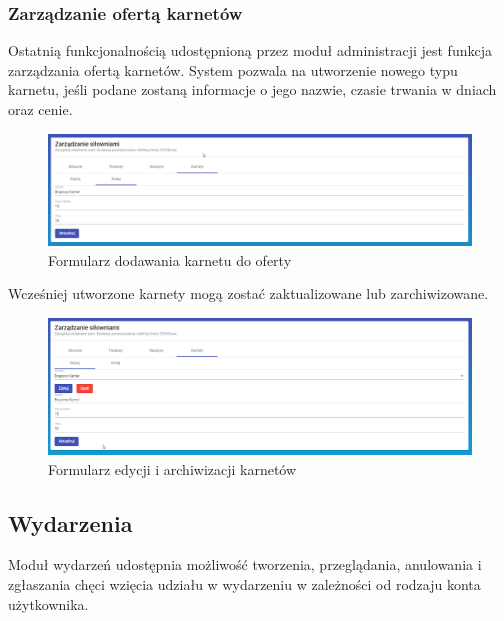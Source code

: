 \documentclass[a4paper,twoside,12pt]{book}
\begin{document}
\subsubsection{Zarządzanie ofertą karnetów}
Ostatnią funkcjonalnością udostępnioną przez moduł administracji jest funkcja zarządzania ofertą karnetów. System pozwala na utworzenie nowego typu karnetu, jeśli podane zostaną informacje o jego nazwie, czasie trwania w dniach oraz cenie.
\begin{figure}[H]
	\centering
	\includegraphics[width=1\linewidth]{../zrzuty_ekranu/dzialanie/karnety/tworzenie_karnetu}
	\caption{Formularz dodawania karnetu do oferty}
	\label{fig:tworzeniekarnetu}
\end{figure}

Wcześniej utworzone karnety mogą zostać zaktualizowane lub zarchiwizowane.
\begin{figure}[H]
	\centering
	\includegraphics[width=1\linewidth]{../zrzuty_ekranu/dzialanie/karnety/edycja_karnetu}
	\caption{Formularz edycji i archiwizacji karnetów}
	\label{fig:edycjakarnetu}
\end{figure}


\subsection{Wydarzenia}
Moduł wydarzeń udostępnia możliwość tworzenia, przeglądania, anulowania i zgłaszania chęci wzięcia udziału w wydarzeniu w zależności od rodzaju konta użytkownika.
\end{document}
